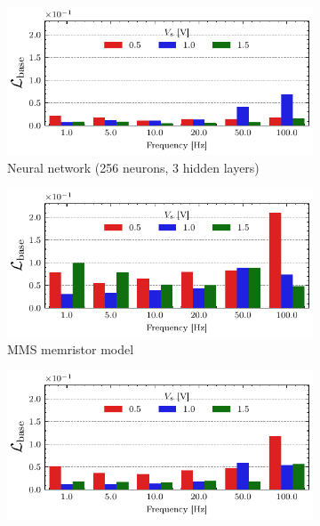 \documentclass[11pt, oneside]{article}
\begin{document}
\begin{figure}[htbp!]
    \centering
    \begin{subfigure}[c]{0.48\linewidth}
        \centering
        \includegraphics[width=\linewidth]{mms_results/loss_per_freq_256 neurons, 3 layers.pdf}
        \caption{Neural network (256 neurons, 3 hidden layers)}
    \end{subfigure}
    \begin{subfigure}[c]{0.48\linewidth}
        \centering
        \includegraphics[width=\linewidth]{mms_results/loss_per_freq_MMS Model.pdf}
        \caption{MMS memristor model}
    \end{subfigure}
    \begin{subfigure}[c]{0.48\linewidth}
        \centering
        \includegraphics[width=\linewidth]{mms_results/loss_per_freq_GMMS Model.pdf}

\end{subfigure}
\end{figure}
\end{document}
